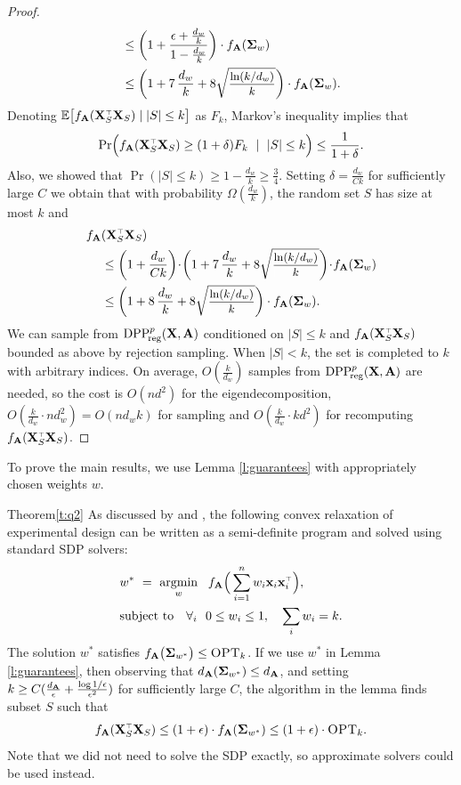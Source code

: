 \documentclass[11pt]{article}
\begin{document}
\begin{proof}
\begin{align*}
  &\leq
  \bigg(1+\frac{\epsilon+\frac{d_w}k}{1-\frac{d_w}k}\bigg)\cdot
f_{\A}(\Sigmab_w)
\\ &\leq \bigg(1+7\,\frac{d_w}{k} +
  8\sqrtshort{\frac{\ln(k/d_w)}{k}}\bigg)\cdot f_{\A}(\Sigmab_w).
\end{align*}
Denoting $\E\big[f_{\A}(\X_S^\top\X_S)\mid |S|\leq k\big]$ as $F_k$,
Markov's inequality implies that
\[\Pr\Big(f_{\A}(\X_S^\top\X_S) \geq
  (1+\delta) F_k\ \mid\ |S|\leq k\Big)\leq \frac1{1+\delta}.\]
Also, we showed
that $\Pr(|S|\leq k)\geq 1-\frac{d_w}{k}\geq \frac34$. Setting $\delta=\frac{d_w}{C
  k}$ for sufficiently large $C$ we obtain that with probability
$\Omega(\frac{d_w}{k})$, the random set $S$ has size at most $k$ and
\begin{align*}
f_{\A}&(\X_S^\top\X_S) \\
&\leq \bigg(1+\frac{d_w}{C k}\bigg)\!\cdot\! \bigg(1+7\,\frac{d_w}{k} +
  8\sqrtshort{\frac{\ln(k/d_w)}{k}}\bigg)\!\cdot\! f_{\A}(\Sigmab_w)\\
&\leq
\bigg(1+8\,\frac{d_w}{k} +
  8\sqrtshort{\frac{\ln(k/d_w)}{k}}\bigg)\cdot f_{\A}(\Sigmab_w).
\end{align*}
We can sample from ${{\mathrm{DPP}}_{\!\mathrm{reg}}^{p}}(\mathbf X,\mathbf A)$ conditioned on
$|S|\leq k$ and $f_{\A}(\X_S^\top\X_S)$ bounded as above by rejection
sampling. When $|S|<k$,  the set is completed to
$k$ with arbitrary indices. On average, $O(\frac k{d_w})$ samples from
${{\mathrm{DPP}}_{\!\mathrm{reg}}^{p}}(\mathbf X,\mathbf A)$ are needed, so the cost is $O(nd^2)$ for the
eigendecomposition, $O(\frac{k}{d_w}\cdot nd_w^2)=O(nd_wk)$ for
sampling and $O(\frac k{d_w}\cdot kd^2)$ for recomputing $f_{\A}(\X_S^\top\X_S)$.
\end{proof}
To prove the main results, we use Lemma \ref{l:guarantees} with
appropriately chosen weights $w$.
\begin{proofof}{Theorem}{\ref{t:q2}}
  As discussed by \cite{near-optimal-design} and
  \cite{boyd2004convex}, the following convex 
relaxation of experimental design can be written as a semi-definite
program and solved using standard SDP solvers:
\begin{align}
  &w^* \ = \  \argmin_w\ \
  f_{\A}\Big(\sum_{i=1}^nw_i\x_i\x_i^\top\Big),\quad\\
  &\text{subject to}\quad
  \forall_i\ \ 0\leq w_i\leq 1,\quad \sum_i w_i=k.\label{eq:sdp}
\end{align}
The solution $w^*$ satisfies $f_{\mathbf A}\big(\mathbf{\Sigma}_{w^*}\big)\leq
{\textsc{OPT}_k}$. If we use $w^*$ in Lemma \ref{l:guarantees}, then observing
that $d_{\mathbf A}(\mathbf{\Sigma}_{w^*})\leq d_{\mathbf A}$, and setting $k\geq C(\frac
{d_{\mathbf A}}{\epsilon} + \frac{\log1/\epsilon}{\epsilon^2})$ for
sufficiently large $C$, the algorithm in the lemma finds subset $S$
such that
\[f_{\A}(\X_S^\top\X_S)\leq (1+\epsilon)\cdot
f_{\A}(\Sigmab_{w^*})\leq
(1+\epsilon)\cdot\opt.\]
Note that we did not need to
solve the SDP exactly, so approximate solvers could be used instead.
\end{proofof}
\end{document}
